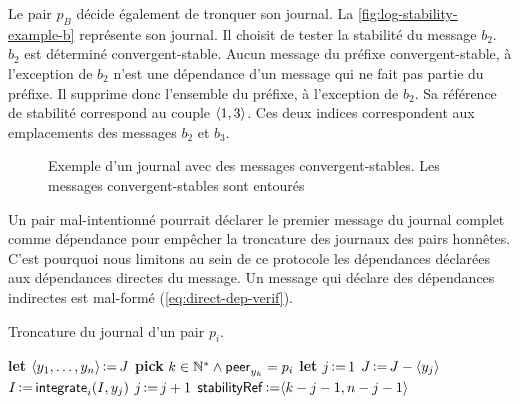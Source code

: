Le pair $p_B$ décide également de tronquer son journal.
La \autoref{fig:log-stability-example-b} représente son journal.
Il choisit de tester la stabilité du message $b_2$.
$b_2$ est déterminé convergent-stable.
Aucun message du préfixe convergent-stable, à l'exception de $b_2$ n'est une dépendance d'un message qui ne fait pas partie du préfixe.
Il supprime donc l'ensemble du préfixe, à l'exception de $b_2$.
Sa référence de stabilité correspond au couple $\tuple*{1, 3}$.
Ces deux indices correspondent aux emplacements des messages $b_2$ et $b_3$.

\begin{figure}[hbt]
\centering
{}
\caption[Exemple d'un journal avec des messages convergent-stables]{Exemple d'un journal avec des messages convergent-stables.
Les messages convergent-stables sont entourés}\label{fig:log-stability-example-b}
\end{figure}

Un pair mal-intentionné pourrait déclarer le premier message du journal complet comme dépendance pour empêcher la troncature des journaux des pairs honnêtes.
C'est pourquoi nous limitons au sein de ce protocole les dépendances déclarées aux dépendances directes du message.
Un message qui déclare des dépendances indirectes est mal-formé (\autoref{eq:direct-dep-verif}).

\begin{algorithm}[ht]
\caption{Troncature du journal d'un pair $p_i$.}\label{alg:log-truncation}
\begin{algorithmic}[1]
    \State \textbf{let} $\tuple*{y_1, \dotsc, y_n} \assign J$
    \State \textbf{pick} $k \in \mathbb{N}^* \land \trm{peer}_{y_k} = p_i$
        \State \textbf{let} $j \assign 1$
            \State $J \assign J \sminus \tuple*{y_j}$ 
            \State $I \assign \trm{integrate}_i(I, y_j)$ 
            \State $j \assign j + 1$ 
        \EndWhile
        \State $\trm{stabilityRef} \assign \tuple*{k - j - 1, n - j - 1}$ 
    \EndIf
\EndProcedure
\end{algorithmic}
\end{algorithm}


